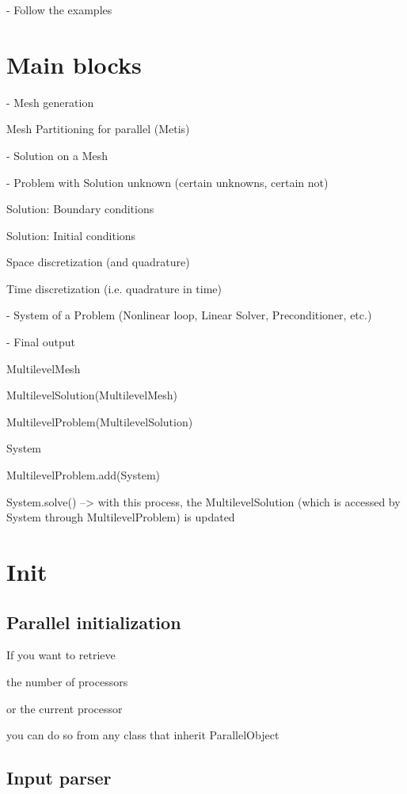 \documentclass[10pt]{book}
\begin{document}
  - Follow the examples

  
   \chapter{Main blocks}


 
 - Mesh generation
 
   Mesh Partitioning for parallel (Metis)
 
 - Solution on a Mesh

 - Problem with Solution unknown (certain unknowns, certain not)
 
 Solution: Boundary conditions
 
 Solution: Initial conditions
 
 Space discretization (and quadrature)
 
 Time discretization (i.e. quadrature in time)
 
 - System of a Problem (Nonlinear loop, Linear Solver, Preconditioner, etc.)
 
 - Final output
 
 
 
 

  
  MultilevelMesh
  
  MultilevelSolution(MultilevelMesh)
  
   MultilevelProblem(MultilevelSolution)

   System
   
   MultilevelProblem.add(System)
   
   System.solve() --> with this process, the MultilevelSolution (which is accessed by System through MultilevelProblem) is updated
   
   
 \chapter{Init}

   \section{Parallel initialization}
   
   If you want to retrieve 
   
   the number of processors
   
   or the current processor
   
   you can do so from any class that inherit ParallelObject
   
   
   
   \section{Input parser}
   
\end{document}
